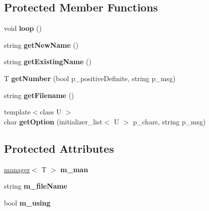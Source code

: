 \subsection*{Protected Member Functions}
\begin{DoxyCompactItemize}
\item 
\hypertarget{classpolygons_1_1app_ad8953bfb86943eb52851971a786d0bf8}{void {\bfseries loop} ()}\label{classpolygons_1_1app_ad8953bfb86943eb52851971a786d0bf8}

\item 
\hypertarget{classpolygons_1_1app_a54b9b363ea71f6a0df9936a5498e05d5}{string {\bfseries get\-New\-Name} ()}\label{classpolygons_1_1app_a54b9b363ea71f6a0df9936a5498e05d5}

\item 
\hypertarget{classpolygons_1_1app_a685b0431705cfa698fbcf15112694a36}{string {\bfseries get\-Existing\-Name} ()}\label{classpolygons_1_1app_a685b0431705cfa698fbcf15112694a36}

\item 
\hypertarget{classpolygons_1_1app_a4f9da856aa9944fa104fd63ff86feb40}{T {\bfseries get\-Number} (bool p\-\_\-positive\-Definite, string p\-\_\-msg)}\label{classpolygons_1_1app_a4f9da856aa9944fa104fd63ff86feb40}

\item 
\hypertarget{classpolygons_1_1app_ab7bed478ee5edd256e1bc6c5ecb34fc1}{string {\bfseries get\-Filename} ()}\label{classpolygons_1_1app_ab7bed478ee5edd256e1bc6c5ecb34fc1}

\item 
\hypertarget{classpolygons_1_1app_a2e559bc56e3dc8aecc344ddfe6a15388}{{\footnotesize template$<$class U $>$ }\\char {\bfseries get\-Option} (initializer\-\_\-list$<$ U $>$ p\-\_\-chars, string p\-\_\-msg)}\label{classpolygons_1_1app_a2e559bc56e3dc8aecc344ddfe6a15388}

\end{DoxyCompactItemize}
\subsection*{Protected Attributes}
\begin{DoxyCompactItemize}
\item 
\hypertarget{classpolygons_1_1app_a9a23bbc7fcd63799c4519c13616285f7}{\hyperlink{classpolygons_1_1manager}{manager}$<$ T $>$ {\bfseries m\-\_\-man}}\label{classpolygons_1_1app_a9a23bbc7fcd63799c4519c13616285f7}

\item 
\hypertarget{classpolygons_1_1app_a0ed33f611d56816f2cad442968e73c8b}{string {\bfseries m\-\_\-file\-Name}}\label{classpolygons_1_1app_a0ed33f611d56816f2cad442968e73c8b}

\item 
\hypertarget{classpolygons_1_1app_a19a74b237359a316270424bac4a82065}{bool {\bfseries m\-\_\-using}}\label{classpolygons_1_1app_a19a74b237359a316270424bac4a82065}

\end{DoxyCompactItemize}


